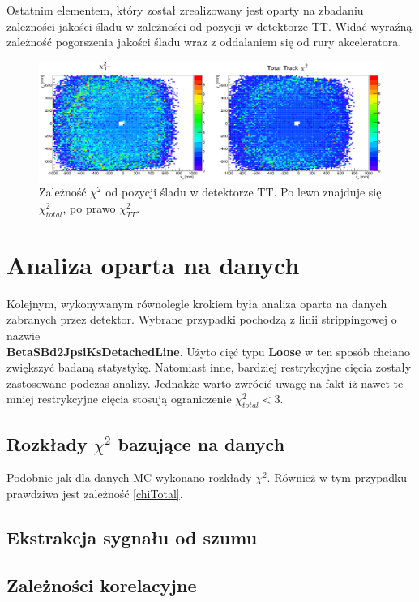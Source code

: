 Ostatnim elementem, który został zrealizowany jest oparty na zbadaniu zależności jakości śladu w zależności od pozycji w detektorze TT. Widać wyraźną zależność pogorszenia jakości śladu wraz z oddalaniem się od rury akceleratora. 

 \begin{figure}[H]
 \centering
 \includegraphics[scale=0.35]{rozdzial6/Chi2_vs_position_TT.png}
 \caption{Zależność $\chi^2$ od pozycji śladu w detektorze TT. Po lewo znajduje się $\chi^2_{total}$, po prawo $\chi^2_{TT}$. }
 \label{rys:BJPsi}
\end{figure}

\section{Analiza oparta na danych}
Kolejnym, wykonywanym równolegle krokiem była analiza oparta na danych zabranych przez detektor. Wybrane przypadki pochodzą z linii strippingowej o nazwie \\ \textbf{BetaSBd2JpsiKsDetachedLine}. Użyto cięć typu \textbf{Loose} w ten sposób chciano zwiększyć badaną statystykę. Natomiast inne, bardziej restrykcyjne cięcia zostały zastosowane podczas analizy. Jednakże warto zwrócić uwagę na fakt iż nawet te mniej restrykcyjne cięcia stosują ograniczenie $\chi^2_{total}<3$. 

\subsection{Rozkłady $\chi^2$ bazujące na danych}
Podobnie jak dla danych MC wykonano rozkłady $\chi^2$. Również w tym przypadku prawdziwa jest zależność \ref{chiTotal}.  

\subsection{Ekstrakcja sygnału od szumu}
\subsection{Zależności korelacyjne}